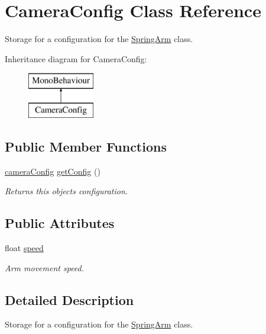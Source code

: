\hypertarget{class_camera_config}{}\section{Camera\+Config Class Reference}
\label{class_camera_config}


Storage for a configuration for the \mbox{\hyperlink{class_spring_arm}{Spring\+Arm}} class.  


Inheritance diagram for Camera\+Config\+:\begin{figure}[H]
\begin{center}
\leavevmode
\includegraphics[height=2.000000cm]{class_camera_config}
\end{center}
\end{figure}
\subsection*{Public Member Functions}
\begin{DoxyCompactItemize}
\item 
\mbox{\hyperlink{structcamera_config}{camera\+Config}} \mbox{\hyperlink{class_camera_config_a4ae099d8e77eb955a53f223f2bbc7279}{get\+Config}} ()
\begin{DoxyCompactList}\small\item\em Returns this objects configuration. \end{DoxyCompactList}\end{DoxyCompactItemize}
\subsection*{Public Attributes}
\begin{DoxyCompactItemize}
\item 
float \mbox{\hyperlink{class_camera_config_a697a6874e8f2c7ab709fe6f0b9d71238}{speed}}
\begin{DoxyCompactList}\small\item\em Arm movement speed. \end{DoxyCompactList}\end{DoxyCompactItemize}


\subsection{Detailed Description}
Storage for a configuration for the \mbox{\hyperlink{class_spring_arm}{Spring\+Arm}} class. 



